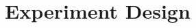\documentclass[../main/Feedback.tex]{subfiles}
\begin{document}
\section{Experiment Design}
\end{document}
